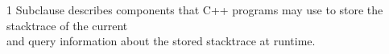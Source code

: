 
\cbend


1 Subclause  describes components that C++ programs may use to
store the stacktrace of the current \\
and query information about the stored stacktrace at runtime.

